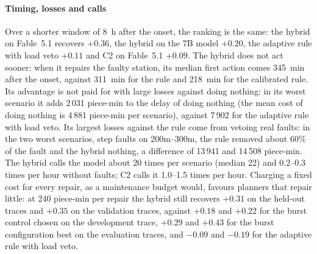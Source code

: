 \documentclass[preprint,11pt]{elsarticle}
\begin{document}
\paragraph{Timing, losses and calls}
Over a shorter window of 8~h after the onset, the ranking is the same: the hybrid on Fable~5.1 recovers $+0.36$, the hybrid on the 7B model $+0.20$, the adaptive rule with load veto $+0.11$ and C2 on Fable~5.1 $+0.09$. The hybrid does not act sooner: when it repairs the faulty station, its median first action comes 345~min after the onset, against 311~min for the rule and 218~min for the calibrated rule. Its advantage is not paid for with large losses against doing nothing: in its worst scenario it adds 2\,031 piece-min to the delay of doing nothing (the mean cost of doing nothing is 4\,881 piece-min per scenario), against 7\,902 for the adaptive rule with load veto. Its largest losses against the rule come from vetoing real faults: in the two worst scenarios, step faults on 200m--300m, the rule removed about 60\% of the fault and the hybrid nothing, a difference of 13\,941 and 14\,508 piece-min. The hybrid calls the model about 20 times per scenario (median 22) and 0.2--0.3 times per hour without faults; C2 calls it 1.0--1.5 times per hour. Charging a fixed cost for every repair, as a maintenance budget would, favours planners that repair little: at 240 piece-min per repair the hybrid still recovers $+0.31$ on the held-out traces and $+0.35$ on the validation traces, against $+0.18$ and $+0.22$ for the burst control chosen on the development trace, $+0.29$ and $+0.43$ for the burst configuration best on the evaluation traces, and $-0.09$ and $-0.19$ for the adaptive rule with load veto.
\end{document}
